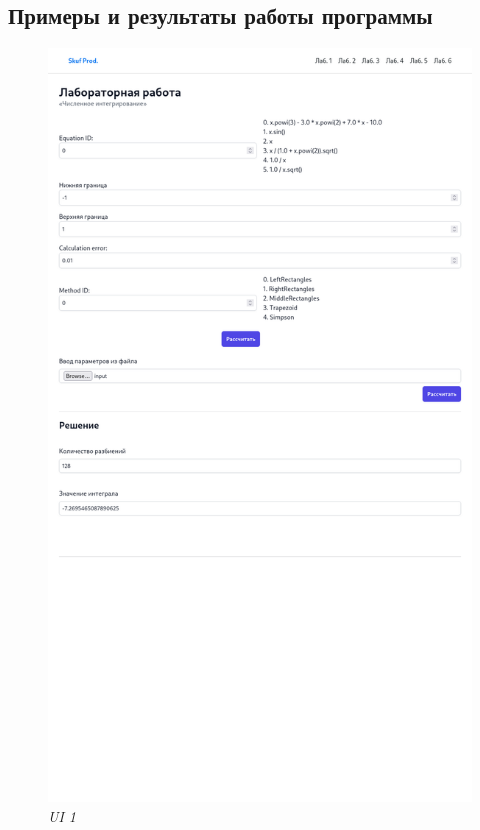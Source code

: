 \documentclass{article}
\begin{document}
      \subsection{Примеры и результаты работы программы}
            \begin{figure}[H] 
                  \begin{center}  
                         \includegraphics[scale=0.3]{ui2.png}
                        \caption{\small \sl {UI  1}}  
                  \end{center}  
            \end{figure}
\end{document}
